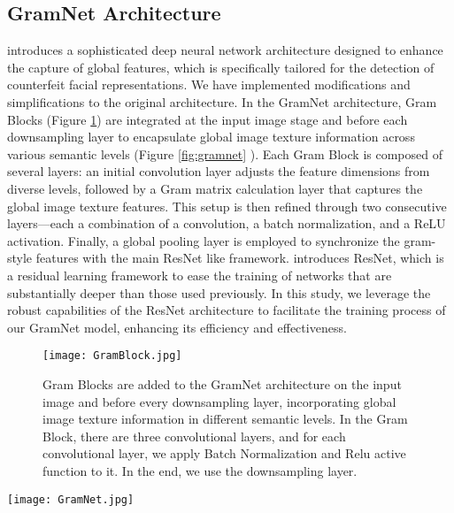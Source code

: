 \documentclass[rebuttal]{cvpr}
\begin{document}
\subsection{GramNet Architecture}
\cite{liu2020global} introduces a sophisticated deep neural network architecture designed to enhance the capture of global features, which is specifically tailored for the detection of counterfeit facial representations. We have implemented modifications and simplifications to the original architecture. In the GramNet architecture, Gram Blocks (Figure \ref{fig:gramblock}) are integrated at the input image stage and before each downsampling layer to encapsulate global image texture information across various semantic levels (Figure \ref{fig:gramnet} ). Each Gram Block is composed of several layers: an initial convolution layer adjusts the feature dimensions from diverse levels, followed by a Gram matrix calculation layer that captures the global image texture features. This setup is then refined through two consecutive layers—each a combination of a convolution, a batch normalization, and a ReLU activation. Finally, a global pooling layer is employed to synchronize the gram-style features with the main ResNet like framework. \cite{he2015deep} introduces ResNet, which is a residual learning framework to ease the training of networks that are substantially deeper than those used previously. In this study, we leverage the robust capabilities of the ResNet architecture to facilitate the training process of our GramNet model, enhancing its efficiency and effectiveness.

\begin{figure}[t]
\begin{center}
   \texttt{[image: GramBlock.jpg]}
\end{center}
   \caption{Gram Blocks are added to the GramNet architecture on the input image and before every downsampling layer, incorporating global image texture information in different semantic levels. In the Gram Block, there are three convolutional layers, and for each convolutional layer, we apply Batch Normalization and Relu active function to it. In the end, we use the downsampling layer.}
\label{fig:long}
\label{fig:gramblock}
\end{figure}

\begin{figure*}[t]
\begin{center}
   \texttt{[image: GramNet.jpg]}
\end{center}
   \caption{In the GramNet architecture, Gram Blocks are strategically integrated to enhance the capture of global features.}
\label{fig:long}
\label{fig:gramnet}
\end{figure*}
\end{document}
